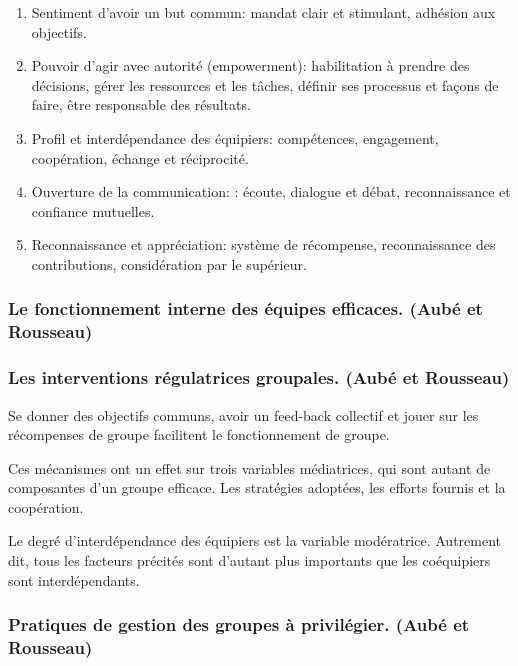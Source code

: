 \documentclass[12pt]{article}
\begin{document}
	\begin{enumerate}
	\item  Sentiment d'avoir un but commun: mandat clair et stimulant, adhésion aux objectifs.
	\item Pouvoir d'agir avec autorité (empowerment): habilitation à prendre des décisions, gérer les ressources et les tâches, définir ses processus et façons de faire, être responsable des résultats.
	\item Profil et interdépendance des équipiers: compétences, engagement, coopération, échange et réciprocité.
	\item Ouverture de la communication: : écoute, dialogue et débat, reconnaissance et confiance mutuelles.
	\item Reconnaissance et appréciation: système de récompense, reconnaissance des contributions, considération par le supérieur.
	\end{enumerate}
	
	\subsubsection*{Le fonctionnement interne des équipes efficaces. (Aubé et Rousseau)}
	
	
	\subsubsection*{Les interventions régulatrices groupales. (Aubé et Rousseau)}
		
	Se donner des objectifs communs, avoir un feed-back collectif et jouer sur les récompenses de groupe facilitent le fonctionnement de groupe. \newline
	
	Ces mécanismes ont un effet sur trois variables médiatrices, qui sont autant de composantes d'un groupe efficace. Les stratégies adoptées, les efforts fournis et la coopération. \newline
	
	Le  degré  d'interdépendance  des  équipiers  est  la  variable  modératrice. Autrement dit, tous les facteurs précités sont d'autant plus importants que les coéquipiers sont interdépendants.
	
	
	\subsubsection*{Pratiques de gestion des groupes à privilégier. (Aubé et Rousseau)}
	
\end{document}
